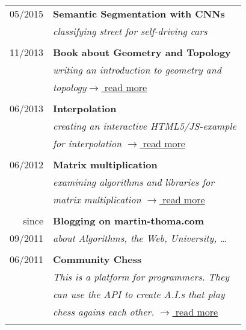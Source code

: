 \documentclass[a4paper,10pt]{article} %
\begin{document}
{\begin{minipage}[t]{0.44\textwidth}
\begin{tabular}{rl}
05/2015  & \textbf{Semantic Segmentation with CNNs}\\
& \textit{classifying street for self-driving cars}\\ \\

11/2013  & \textbf{Book about Geometry and Topology}\\
& \textit{writing an introduction to geometry and}\\
& \textit{topology}\hfill \href{http://martin-thoma.com/geotopo/}{$\rightarrow$ read more}\\ \\

06/2013	 & \textbf{Interpolation}\\
& \textit{creating an interactive HTML5/JS-example}\\
& \textit{for interpolation} \hfill \href{http://martin-thoma.com/polynomial-interpolation/}{$\rightarrow$ read more} \\\\

06/2012	 & \textbf{Matrix multiplication}\\
& \textit{examining algorithms and libraries for}\\
& \textit{matrix multiplication} \hfill \href{http://martin-thoma.com/matrix-multiplication-python-java-cpp/}{$\rightarrow$ read more}\\\\

since	 & \textbf{Blogging on martin-thoma.com}\\
09/2011 & \textit{about Algorithms, the Web, University, \dots}\\ \\


06/2011	 & \textbf{Community Chess}\\
& \textit{This is a platform for programmers. They}\\
& \textit{can use the API to create A.I.s that play}\\
& \textit{chess agains each other. } \hfill \href{https://github.com/MartinThoma/community-chess}{$\rightarrow$ read more}\\\\
\end{tabular}\\[10pt]


\end{minipage}}
\end{document}
